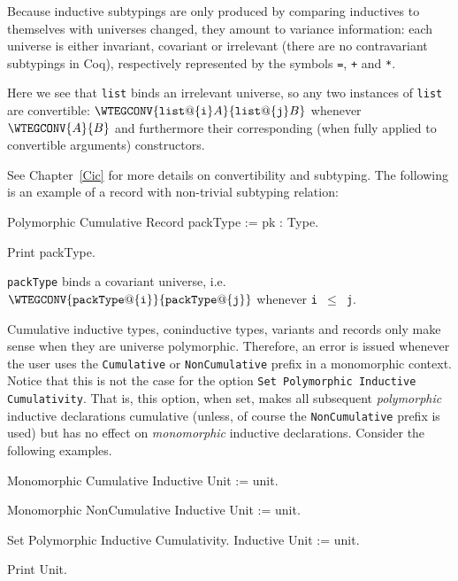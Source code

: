 Because inductive subtypings are only produced by comparing inductives
to themselves with universes changed, they amount to variance
information: each universe is either invariant, covariant or
irrelevant (there are no contravariant subtypings in Coq),
respectively represented by the symbols \texttt{=}, \texttt{+} and
\texttt{*}.

Here we see that \texttt{list} binds an irrelevant universe, so any
two instances of \texttt{list} are convertible:
$\WTEGCONV{\mathtt{list@\{i\}} A}{\mathtt{list@\{j\}} B}$ whenever
$\WTEGCONV{A}{B}$ and furthermore their corresponding (when fully
applied to convertible arguments) constructors.

See Chapter~\ref{Cic} for more details on convertibility and subtyping.
The following is an example of a record with non-trivial subtyping relation:
\begin{coq_example*}
Polymorphic Cumulative Record packType := {pk : Type}.
\end{coq_example*}
\begin{coq_example}
Print packType.
\end{coq_example}
\texttt{packType} binds a covariant universe, i.e.
$\WTEGCONV{\mathtt{packType@\{i\}}}{\mathtt{packType@\{j\}}}$ whenever
\texttt{i $\leq$ j}.

Cumulative inductive types, coninductive types, variants and records
only make sense when they are universe polymorphic. Therefore, an
error is issued whenever the user uses the \texttt{Cumulative} or
\texttt{NonCumulative} prefix in a monomorphic context.
Notice that this is not the case for the option \texttt{Set Polymorphic Inductive Cumulativity}.
That is, this option, when set, makes all subsequent \emph{polymorphic}
inductive declarations cumulative (unless, of course the \texttt{NonCumulative} prefix is used)
but has no effect on \emph{monomorphic} inductive declarations.
Consider the following examples.
\begin{coq_example}
Monomorphic Cumulative Inductive Unit := unit.
\end{coq_example}
\begin{coq_example}
Monomorphic NonCumulative Inductive Unit := unit.
\end{coq_example}
\begin{coq_example*}
Set Polymorphic Inductive Cumulativity.
Inductive Unit := unit.
\end{coq_example*}
\begin{coq_example}
Print Unit.
\end{coq_example}

